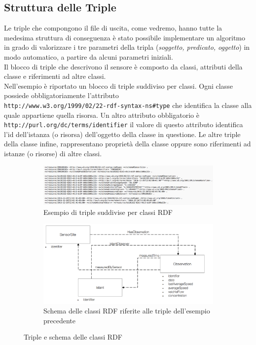 \documentclass[12pt,a4paper,italian]{article}
\begin{document}
\subsection{Struttura delle Triple}
Le triple che compongono il file di uscita, come vedremo, hanno tutte la medesima struttura di conseguenza è stato possibile implementare un algoritmo in grado di valorizzare
i tre parametri della tripla (\emph{soggetto, predicato, oggetto}) in modo automatico, a partire da alcuni parametri iniziali.\\
Il blocco di triple che descrivono il sensore è composto da classi, attributi della classe e riferimenti ad altre classi.\\
Nell'esempio è riportato un blocco di triple suddiviso per classi. Ogni classe possiede obbligatoriamente l'attributo\\ \texttt{http://www.w3.org/1999/02/22-rdf-syntax-ns\#type} che identifica la classe alla quale appartiene quella risorsa.
Un altro attributo obbligatorio è \texttt{http://purl.org/dc/terms/identifier} il valore di questo attributo identifica l'id dell'istanza (o risorsa) dell'oggetto della classe in questione.
Le altre triple della classe infine, rappresentano proprietà della classe oppure sono riferimenti ad istanze (o risorse) di altre classi.\\
\begin{figure}[!h]
	\begin{subfigure}{1\textwidth}
		\centering
		\includegraphics[width=14cm]{img/triple.png}
		\caption{Esempio di triple suddivise per classi RDF}\label{triplerdf}
	\end{subfigure}
	\begin{subfigure}{1\textwidth}
		\centering
		\includegraphics[width=14cm]{img/schema.png}
		\caption{Schema delle classi RDF riferite alle triple dell'esempio precedente}\label{schema}
	\end{subfigure}
	\caption{Triple e schema delle classi RDF}\label{rdfcombo}
\end{figure}
\end{document}
